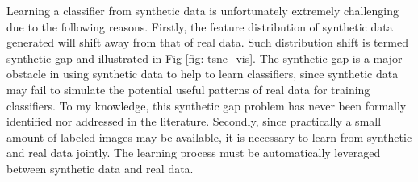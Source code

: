\documentclass{iitthesis}
\begin{document}

Learning a classifier from synthetic data is unfortunately extremely challenging due to the following reasons. Firstly, the feature distribution of synthetic data generated will shift away from that of real data. Such distribution shift is termed synthetic gap and illustrated in Fig \ref{fig: tsne_vis}. The synthetic gap is a major obstacle in using synthetic data to help to learn classifiers, since synthetic data may fail to simulate the potential useful patterns of real data for training classifiers. To my knowledge, this synthetic gap problem has never been formally identified nor addressed in the literature. Secondly, since practically a small amount of labeled images may be available, it is necessary to learn from synthetic and real data jointly. The learning process must be automatically leveraged between synthetic data and real data.
\end{document}
